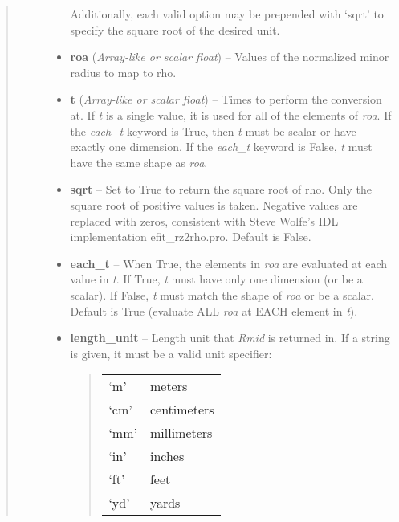 \documentclass[letterpaper,10pt,english]{sphinxmanual}
\begin{document}
\begin{fulllineitems}
\begin{fulllineitems}
\begin{quote}
\begin{description}
\begin{itemize}
\begin{quote}
\end{quote}

Additionally, each valid option may be prepended with `sqrt'
to specify the square root of the desired unit.


\item {} 
\textbf{roa} (\emph{Array-like or scalar float}) -- Values of the normalized minor
radius to map to rho.

\item {} 
\textbf{t} (\emph{Array-like or scalar float}) -- Times to perform the conversion at.
If \emph{t} is a single value, it is used for all of the elements of
\emph{roa}. If the \emph{each\_t} keyword is True, then \emph{t} must be scalar
or have exactly one dimension. If the \emph{each\_t} keyword is False,
\emph{t} must have the same shape as \emph{roa}.

\item {} 
\textbf{sqrt} -- Set to True to return the square root of rho.
Only the square root of positive values is taken. Negative
values are replaced with zeros, consistent with Steve Wolfe's
IDL implementation efit\_rz2rho.pro. Default is False.

\item {} 
\textbf{each\_t} -- When True, the elements in \emph{roa} are evaluated
at each value in \emph{t}. If True, \emph{t} must have only one dimension
(or be a scalar). If False, \emph{t} must match the shape of \emph{roa}
or be a scalar. Default is True (evaluate ALL \emph{roa} at EACH
element in \emph{t}).

\item {} 
\textbf{length\_unit} -- 
Length unit that \emph{Rmid} is returned in.
If a string is given, it must be a valid unit specifier:
\begin{quote}

\begin{tabulary}{\linewidth}{|L|L|}
\hline

`m'
 & 
meters
\\

`cm'
 & 
centimeters
\\

`mm'
 & 
millimeters
\\

`in'
 & 
inches
\\

`ft'
 & 
feet
\\

`yd'
 & 
yards
\\


\end{tabulary}
\end{quote}
\end{itemize}
\end{description}
\end{quote}
\end{fulllineitems}
\end{fulllineitems}
\end{document}
